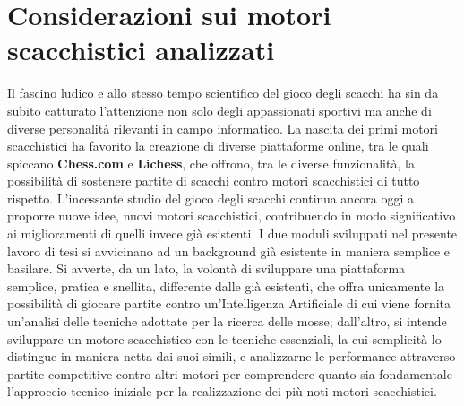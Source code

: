 \section{Considerazioni sui motori scacchistici analizzati}
Il fascino ludico e allo stesso tempo scientifico del gioco degli scacchi ha sin da subito catturato l'attenzione non solo degli appassionati sportivi ma anche di diverse personalità rilevanti in campo informatico. La nascita dei primi motori scacchistici ha favorito la creazione di diverse piattaforme online, tra le quali spiccano \textbf{Chess.com} e \textbf{Lichess}, che offrono, tra le diverse funzionalità, la possibilità di sostenere partite di scacchi contro motori scacchistici di tutto rispetto. L'incessante studio del gioco degli scacchi continua ancora oggi a proporre nuove idee, nuovi motori scacchistici, contribuendo in modo significativo ai miglioramenti di quelli invece già esistenti\cite{sadler2019tcec15}. I due moduli sviluppati nel presente lavoro di tesi si avvicinano ad un background già esistente in maniera semplice e basilare. Si avverte, da un lato, la volontà di sviluppare una piattaforma semplice, pratica e snellita, differente dalle già esistenti, che offra unicamente la possibilità di giocare partite contro un'Intelligenza Artificiale di cui viene fornita un'analisi delle tecniche adottate per la ricerca delle mosse; dall'altro, si intende sviluppare un motore scacchistico con le tecniche essenziali, la cui semplicità lo distingue in maniera netta dai suoi simili, e analizzarne le performance attraverso partite competitive contro altri motori per comprendere quanto sia fondamentale l'approccio tecnico iniziale per la realizzazione dei più noti motori scacchistici.

\newpage